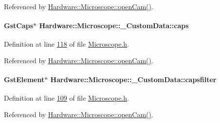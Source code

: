 Referenced by \hyperlink{_microscope_8cpp_source_l00167}{Hardware\+::\+Microscope\+::open\+Cam()}.

\hypertarget{struct_hardware_1_1_microscope_1_1___custom_data_ad068f72fc8487744c2e5e71e9096abf1}{}
\paragraph[{caps}]{\setlength{\rightskip}{0pt plus 5cm}Gst\+Caps$\ast$ Hardware\+::\+Microscope\+::\+\_\+\+Custom\+Data\+::caps}\label{struct_hardware_1_1_microscope_1_1___custom_data_ad068f72fc8487744c2e5e71e9096abf1}


Definition at line \hyperlink{_microscope_8h_source_l00118}{118} of file \hyperlink{_microscope_8h_source}{Microscope.\+h}.



Referenced by \hyperlink{_microscope_8cpp_source_l00167}{Hardware\+::\+Microscope\+::open\+Cam()}.

\hypertarget{struct_hardware_1_1_microscope_1_1___custom_data_ae1032439e4a4cffefd06929d5aa8d283}{}
\paragraph[{capsfilter}]{\setlength{\rightskip}{0pt plus 5cm}Gst\+Element$\ast$ Hardware\+::\+Microscope\+::\+\_\+\+Custom\+Data\+::capsfilter}\label{struct_hardware_1_1_microscope_1_1___custom_data_ae1032439e4a4cffefd06929d5aa8d283}


Definition at line \hyperlink{_microscope_8h_source_l00109}{109} of file \hyperlink{_microscope_8h_source}{Microscope.\+h}.



Referenced by \hyperlink{_microscope_8cpp_source_l00167}{Hardware\+::\+Microscope\+::open\+Cam()}.

\hypertarget{struct_hardware_1_1_microscope_1_1___custom_data_ab745c37a5d761e71a8b60581d23284ec}{}
